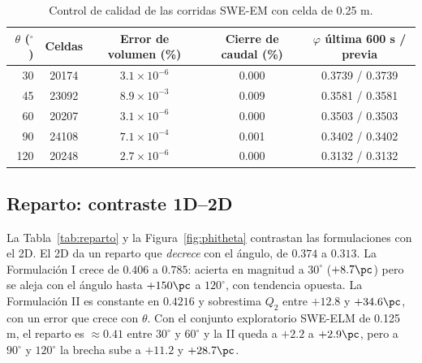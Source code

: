 \begin{table}[H]
\centering\small
\caption{Control de calidad de las corridas SWE-EM con celda de 0.25 m.}\label{tab:cc}
\begin{tabular}{rcccc}
\toprule
$\theta$ ($^\circ$) & Celdas & Error de volumen (\%) & Cierre de caudal (\%) & $\varphi$ última 600 s / previa\\\midrule
30 & 20174 & $3.1\times10^{-6}$ & 0.000 & 0.3739 / 0.3739\\
45 & 23092 & $8.9\times10^{-3}$ & 0.009 & 0.3581 / 0.3581\\
60 & 20207 & $3.1\times10^{-6}$ & 0.000 & 0.3503 / 0.3503\\
90 & 24108 & $7.1\times10^{-4}$ & 0.001 & 0.3402 / 0.3402\\
120 & 20248 & $2.7\times10^{-6}$ & 0.000 & 0.3132 / 0.3132\\\bottomrule
\end{tabular}
\end{table}

\subsection{Reparto: contraste 1D--2D}
La Tabla~\ref{tab:reparto} y la Figura~\ref{fig:phitheta} contrastan las formulaciones con el 2D. El 2D da un reparto que \emph{decrece} con el ángulo, de $0.374$ a $0.313$. La Formulación I crece de $0.406$ a $0.785$: acierta en magnitud a $30^\circ$ ($+8.7\pc$) pero se aleja con el ángulo hasta $+150\pc$ a $120^\circ$, con tendencia opuesta. La Formulación II es constante en $0.4216$ y sobrestima $Q_2$ entre $+12.8$ y $+34.6\pc$, con un error que crece con $\theta$. Con el conjunto exploratorio SWE-ELM de 0.125 m, el reparto es $\approx0.41$ entre $30^\circ$ y $60^\circ$ y la II queda a $+2.2$ a $+2.9\pc$, pero a $90^\circ$ y $120^\circ$ la brecha sube a $+11.2$ y $+28.7\pc$.

